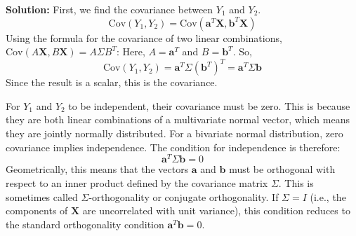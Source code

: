 \textbf{Solution:}
First, we find the covariance between $Y_1$ and $Y_2$.
$$ \text{Cov}(Y_1, Y_2) = \text{Cov}(\mathbf{a}^T\mathbf{X}, \mathbf{b}^T\mathbf{X}) $$
Using the formula for the covariance of two linear combinations, $\text{Cov}(A\mathbf{X}, B\mathbf{X}) = A\Sigma B^T$:
Here, $A = \mathbf{a}^T$ and $B = \mathbf{b}^T$. So,
$$ \text{Cov}(Y_1, Y_2) = \mathbf{a}^T \Sigma (\mathbf{b}^T)^T = \mathbf{a}^T \Sigma \mathbf{b} $$
Since the result is a scalar, this is the covariance.

For $Y_1$ and $Y_2$ to be independent, their covariance must be zero. This is because they are both linear combinations of a multivariate normal vector, which means they are jointly normally distributed. For a bivariate normal distribution, zero covariance implies independence.
The condition for independence is therefore:
$$ \mathbf{a}^T \Sigma \mathbf{b} = 0 $$
Geometrically, this means that the vectors $\mathbf{a}$ and $\mathbf{b}$ must be orthogonal with respect to an inner product defined by the covariance matrix $\Sigma$. This is sometimes called $\Sigma$-orthogonality or conjugate orthogonality. If $\Sigma=I$ (i.e., the components of $\mathbf{X}$ are uncorrelated with unit variance), this condition reduces to the standard orthogonality condition $\mathbf{a}^T\mathbf{b}=0$.
